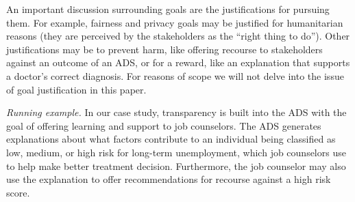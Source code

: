 An important discussion surrounding goals are the justifications for pursuing them.  For example, fairness and privacy goals may be justified for humanitarian reasons (they are perceived by the stakeholders as the ``right thing to do'').  Other justifications may be to prevent harm, like offering recourse to stakeholders against an outcome of an ADS, or for a reward, like an explanation that supports a doctor's correct diagnosis.  For reasons of scope we will not delve into the issue of goal justification in this paper.

\emph{Running example.} In our case study, transparency is built into the ADS with the goal of offering learning and support to job counselors. The ADS generates explanations about what factors contribute to an individual being classified as low, medium, or high risk for long-term unemployment, which job counselors use to help make better treatment decision.  Furthermore, the job counselor may also use the explanation to offer recommendations for recourse against a high risk score.

